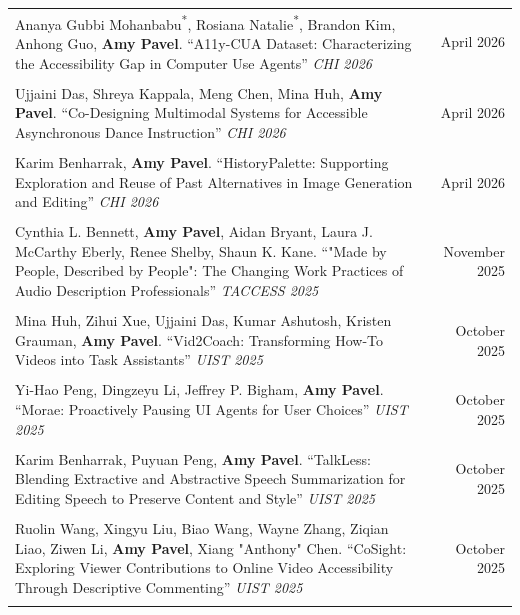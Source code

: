 \begin{longtable}{Xr}
	Ananya Gubbi Mohanbabu\textsuperscript{*}, Rosiana Natalie\textsuperscript{*}, Brandon Kim, Anhong Guo, \textbf{Amy Pavel}. ``A11y-CUA Dataset: Characterizing the Accessibility Gap in Computer Use Agents'' \textit{CHI 2026} & April 2026 \\
	\\

	Ujjaini Das, Shreya Kappala, Meng Chen, Mina Huh, \textbf{Amy Pavel}. ``Co-Designing Multimodal Systems for Accessible Asynchronous Dance Instruction'' \textit{CHI 2026} & April 2026 \\
	\\

	Karim Benharrak, \textbf{Amy Pavel}. ``HistoryPalette: Supporting Exploration and Reuse of Past Alternatives in Image Generation and Editing'' \textit{CHI 2026} & April 2026 \\
	\\

	Cynthia L. Bennett, \textbf{Amy Pavel}, Aidan Bryant, Laura J. McCarthy Eberly, Renee Shelby, Shaun K. Kane. ``"Made by People, Described by People": The Changing Work Practices of Audio Description Professionals'' \textit{TACCESS 2025} & November 2025 \\
	\\

	Mina Huh, Zihui Xue, Ujjaini Das, Kumar Ashutosh, Kristen Grauman, \textbf{Amy Pavel}. ``Vid2Coach: Transforming How-To Videos into Task Assistants'' \textit{UIST 2025} & October 2025 \\
	\\

	Yi-Hao Peng, Dingzeyu Li, Jeffrey P. Bigham, \textbf{Amy Pavel}. ``Morae: Proactively Pausing UI Agents for User Choices'' \textit{UIST 2025} & October 2025 \\
	\\

	Karim Benharrak, Puyuan Peng, \textbf{Amy Pavel}. ``TalkLess: Blending Extractive and Abstractive Speech Summarization for Editing Speech to Preserve Content and Style'' \textit{UIST 2025} & October 2025 \\
	\\

	Ruolin Wang, Xingyu Liu, Biao Wang, Wayne Zhang, Ziqian Liao, Ziwen Li, \textbf{Amy Pavel}, Xiang "Anthony" Chen. ``CoSight: Exploring Viewer Contributions to Online Video Accessibility Through Descriptive Commenting'' \textit{UIST 2025} & October 2025 \\
	\\


\end{longtable}
